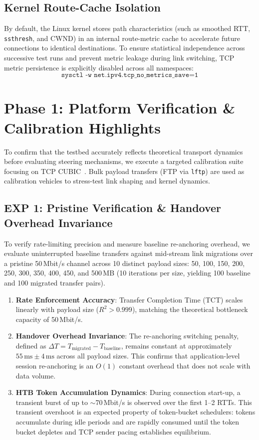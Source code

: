 \documentclass[conference]{IEEEtran}
\begin{document}
\subsection{Kernel Route-Cache Isolation}
By default, the Linux kernel stores path characteristics (such as smoothed RTT, \texttt{ssthresh}, and CWND) in an internal route-metric cache to accelerate future connections to identical destinations. To ensure statistical independence across successive test runs and prevent metric leakage during link switching, TCP metric persistence is explicitly disabled across all namespaces:
\begin{equation}
\texttt{sysctl -w net.ipv4.tcp\_no\_metrics\_save=1}
\end{equation}

\section{Phase 1: Platform Verification \& Calibration Highlights}

To confirm that the testbed accurately reflects theoretical transport dynamics before evaluating steering mechanisms, we execute a targeted calibration suite focusing on TCP CUBIC~\cite{ha2008cubic}. Bulk payload transfers (FTP via \texttt{lftp}) are used as calibration vehicles to stress-test link shaping and kernel dynamics.

\subsection{EXP 1: Pristine Verification \& Handover Overhead Invariance}
To verify rate-limiting precision and measure baseline re-anchoring overhead, we evaluate uninterrupted baseline transfers against mid-stream link migrations over a pristine 50\,Mbit/s channel across 10 distinct payload sizes: 50, 100, 150, 200, 250, 300, 350, 400, 450, and 500\,MB (10 iterations per size, yielding 100 baseline and 100 migrated transfer pairs).

\begin{enumerate}
    \item \textbf{Rate Enforcement Accuracy}: Transfer Completion Time (TCT) scales linearly with payload size ($R^2 > 0.999$), matching the theoretical bottleneck capacity of 50\,Mbit/s.
    \item \textbf{Handover Overhead Invariance}: The re-anchoring switching penalty, defined as $\Delta T = T_{\text{migrated}} - T_{\text{baseline}}$, remains constant at approximately $55\,\text{ms} \pm 4\,\text{ms}$ across all payload sizes. This confirms that application-level session re-anchoring is an $O(1)$ constant overhead that does not scale with data volume.
    \item \textbf{HTB Token Accumulation Dynamics}: During connection start-up, a transient burst of up to $\sim$70\,Mbit/s is observed over the first 1--2 RTTs. This transient overshoot is an expected property of token-bucket schedulers: tokens accumulate during idle periods and are rapidly consumed until the token bucket depletes and TCP sender pacing establishes equilibrium.
\end{enumerate}
\end{document}
